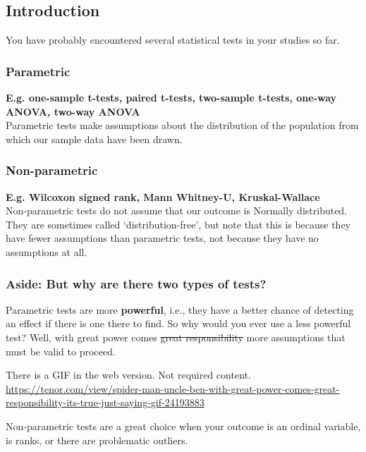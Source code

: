 \documentclass[
  openany]{book}
\begin{document}
\hypertarget{introduction}{%
\subsection{Introduction}\label{introduction}}

You have probably encountered several statistical tests in your studies so far.

\hypertarget{parametric}{%
\subsubsection{Parametric}\label{parametric}}

\textbf{E.g. one-sample t-tests, paired t-tests, two-sample t-tests, one-way ANOVA, two-way ANOVA}\\
Parametric tests make assumptions about the distribution of the population from which our sample data have been drawn.

\hypertarget{non-parametric}{%
\subsubsection{Non-parametric}\label{non-parametric}}

\textbf{E.g. Wilcoxon signed rank, Mann Whitney-U, Kruskal-Wallace}\\
Non-parametric tests do not assume that our outcome is Normally distributed. They are sometimes called `distribution-free', but note that this is because they have fewer assumptions than parametric tests, not because they have no assumptions at all.

\hypertarget{aside-but-why-are-there-two-types-of-tests}{%
\subsubsection{Aside: But why are there two types of tests?}\label{aside-but-why-are-there-two-types-of-tests}}

Parametric tests are more \textbf{powerful}, i.e., they have a better chance of detecting an effect if there is one there to find. So why would you ever use a less powerful test? Well, with great power comes \sout{great responsibility} more assumptions that must be valid to proceed.

There is a GIF in the web version. Not required content. \url{https://tenor.com/view/spider-man-uncle-ben-with-great-power-comes-great-responsibility-its-true-just-saying-gif-24193883}

Non-parametric tests are a great choice when your outcome is an ordinal variable, is ranks, or there are problematic outliers.
\end{document}
